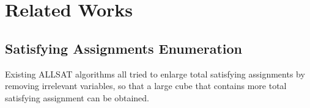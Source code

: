 \documentclass[journal]{IEEEtran}
\begin{document}
\section{Related Works}\label{sec_relwork}
%
%
%
%
%

\subsection{Satisfying Assignments Enumeration}

Existing ALLSAT algorithms all tried to enlarge total satisfying assignments by removing irrelevant variables,
so that a large cube that contains more total satisfying assignment can be obtained.
\end{document}
